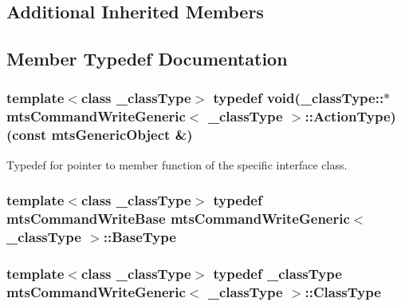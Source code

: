 \subsection*{Additional Inherited Members}


\subsection{Member Typedef Documentation}
\hypertarget{classmts_command_write_generic_abb623932928545068e6df1074d9990e9}{
\subsubsection[{Action\-Type}]{\setlength{\rightskip}{0pt plus 5cm}template$<$class \-\_\-class\-Type$>$ typedef void(\-\_\-class\-Type\-::$\ast$ {\bf mts\-Command\-Write\-Generic}$<$ \-\_\-class\-Type $>$\-::Action\-Type)(const {\bf mts\-Generic\-Object} \&)}}\label{classmts_command_write_generic_abb623932928545068e6df1074d9990e9}
Typedef for pointer to member function of the specific interface class. \hypertarget{classmts_command_write_generic_aa2dd1b534b1f880987ed8b47edbc6b8b}{
\subsubsection[{Base\-Type}]{\setlength{\rightskip}{0pt plus 5cm}template$<$class \-\_\-class\-Type$>$ typedef {\bf mts\-Command\-Write\-Base} {\bf mts\-Command\-Write\-Generic}$<$ \-\_\-class\-Type $>$\-::{\bf Base\-Type}}}\label{classmts_command_write_generic_aa2dd1b534b1f880987ed8b47edbc6b8b}
\hypertarget{classmts_command_write_generic_ab4ffe009b7558cff08d309ba7dfb1235}{
\subsubsection[{Class\-Type}]{\setlength{\rightskip}{0pt plus 5cm}template$<$class \-\_\-class\-Type$>$ typedef \-\_\-class\-Type {\bf mts\-Command\-Write\-Generic}$<$ \-\_\-class\-Type $>$\-::{\bf Class\-Type}}}\label{classmts_command_write_generic_ab4ffe009b7558cff08d309ba7dfb1235}
